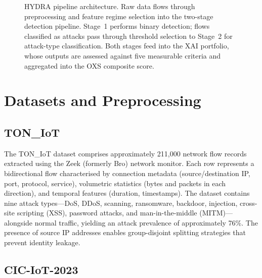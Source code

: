 \documentclass[12pt,a4paper]{report}
\begin{document}
\begin{figure}[H]
\caption{HYDRA pipeline architecture. Raw data flows through preprocessing and feature regime selection into the two-stage detection pipeline. Stage~1 performs binary detection; flows classified as attacks pass through threshold selection to Stage~2 for attack-type classification. Both stages feed into the XAI portfolio, whose outputs are assessed against five measurable criteria and aggregated into the OXS composite score.}
\label{fig:pipeline}
\end{figure}

\section{Datasets and Preprocessing}
\label{sec:datasets}

\subsection{TON\_IoT}
\label{sec:toniot-meth}

The TON\_IoT dataset \citep{moustafa2021} comprises approximately 211,000 network flow records extracted using the Zeek (formerly Bro) network monitor. Each row represents a bidirectional flow characterised by connection metadata (source/destination IP, port, protocol, service), volumetric statistics (bytes and packets in each direction), and temporal features (duration, timestamps). The dataset contains nine attack types---DoS, DDoS, scanning, ransomware, backdoor, injection, cross-site scripting (XSS), password attacks, and man-in-the-middle (MITM)---alongside normal traffic, yielding an attack prevalence of approximately 76\%. The presence of source IP addresses enables group-disjoint splitting strategies that prevent identity leakage.

\subsection{CIC-IoT-2023}
\label{sec:ciciot-meth}
\end{document}

